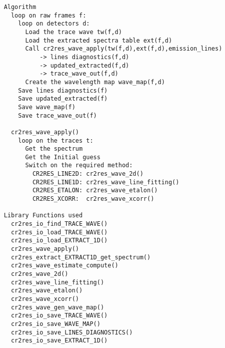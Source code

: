 \begin{verbatim}
    Algorithm                                                             
      loop on raw frames f:                                               
        loop on detectors d:                                              
          Load the trace wave tw(f,d)                                     
          Load the extracted spectra table ext(f,d)                       
          Call cr2res_wave_apply(tw(f,d),ext(f,d),emission_lines)         
              -> lines diagnostics(f,d)                                   
              -> updated_extracted(f,d)                                   
              -> trace_wave_out(f,d)                                      
          Create the wavelength map wave_map(f,d)                         
        Save lines diagnostics(f)                                         
        Save updated_extracted(f)                                         
        Save wave_map(f)                                                  
        Save trace_wave_out(f)                                            
                                                                          
      cr2res_wave_apply()                                                 
        loop on the traces t:                                             
          Get the spectrum                                                
          Get the Initial guess                                           
          Switch on the required method:                                  
            CR2RES_LINE2D: cr2res_wave_2d()                               
            CR2RES_LINE1D: cr2res_wave_line_fitting()                     
            CR2RES_ETALON: cr2res_wave_etalon()                           
            CR2RES_XCORR:  cr2res_wave_xcorr()                            
                                                                          
    Library Functions used                                                
      cr2res_io_find_TRACE_WAVE()                                         
      cr2res_io_load_TRACE_WAVE()                                         
      cr2res_io_load_EXTRACT_1D()                                         
      cr2res_wave_apply()                                                 
      cr2res_extract_EXTRACT1D_get_spectrum()                             
      cr2res_wave_estimate_compute()                                      
      cr2res_wave_2d()                                                    
      cr2res_wave_line_fitting()                                          
      cr2res_wave_etalon()                                                
      cr2res_wave_xcorr()                                                 
      cr2res_wave_gen_wave_map()                                          
      cr2res_io_save_TRACE_WAVE()                                         
      cr2res_io_save_WAVE_MAP()                                           
      cr2res_io_save_LINES_DIAGNOSTICS()                                  
      cr2res_io_save_EXTRACT_1D()                                         
  


\end{verbatim}
